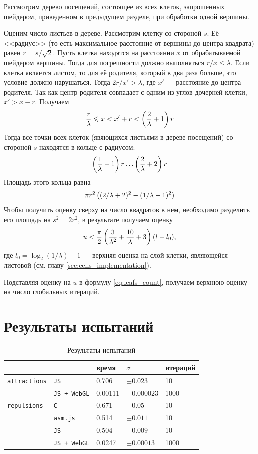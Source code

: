 Рассмотрим дерево посещений, состоящее из всех клеток, запрошенных шейдером, приведенном в предыдущем разделе, при обработки одной вершины.

Оценим число листьев в дереве. Рассмотрим клетку со стороной $s$. Её <<радиус>> (то есть максимальное расстояние от вершины до центра квадрата) равен $r = s / \sqrt{2}$. Пусть клетка находятся на расстоянии $x$ от обрабатываемой шейдером вершины. Тогда для погрешности должно выполняться $r / x \le \lambda$. Если клетка является листом, то для её родителя, который в два раза больше, это условие должно нарушаться. Тогда $2r / x' > \lambda$, где $x'$ --- расстояние до центра родителя. Так как центр родителя совпадает с одним из углов дочерней клетки, $x' > x - r$. Получаем
$$\frac{r}{\lambda} \leqslant x < x' + r < \left(\frac{2}{\lambda} + 1\right) r$$
Тогда все точки всех клеток (явяющихся листьями в дереве посещений) со стороной $s$ находятся в кольце с радиусом:
$$\left(\frac{1}{\lambda} - 1\right) r \ldots \left(\frac{2}{\lambda} + 2\right) r$$
Площадь этого кольца равна
$$\pi r^2 \left((2 / \lambda + 2)^2 - (1/\lambda - 1)^2\right)$$
Чтобы получить оценку сверху на число квадратов в нем, необходимо разделить его площадь на $s^2 = 2r^2$, в результате получаем оценку
$$u < \frac{\pi}{2}\left(\frac{3}{\lambda^2} + \frac{10}{\lambda} + 3\right) (l - l_0),$$
где $l_0 = \log_2(1 / \lambda) - 1$ --- верхняя оценка на слой клетки, являющейся листовой (см. главу \ref{sec:cells_implementation}).

Подставляя оценку на $u$ в формулу \ref{eq:leafs_count}, получаем верхнюю оценку на число глобальных итераций.

\section{Результаты испытаний}

\begin{table}[t]
  \centering
  \begin{tabular}{|l l l l l|}
    \hline
     &  & время & $\sigma$ & итераций \\ \hline
    \texttt{attractions} & \texttt{JS} & 0.706 & $\pm 0.023$ & 10 \\ \cline{2-5}
             & \texttt{JS + WebGL} & 0.00111 & $\pm 0.000023$ & 1000 \\\hline
    \texttt{repulsions} & \texttt{C} & 0.671 & $\pm 0.05$ & 10 \\ \cline{2-5}
     & \texttt{asm.js} & 0.514 & $\pm 0.011$ & 10 \\\cline{2-5}
     & \texttt{JS} & 0.504 & $\pm 0.009$ & 10 \\\cline{2-5}
             & \texttt{JS + WebGL} & 0.0247 & $\pm 0.00013$ & 1000 \\\hline
  \end{tabular}
  \caption{Результаты испытаний}
  \label{tab:myfirsttable}
\end{table}

